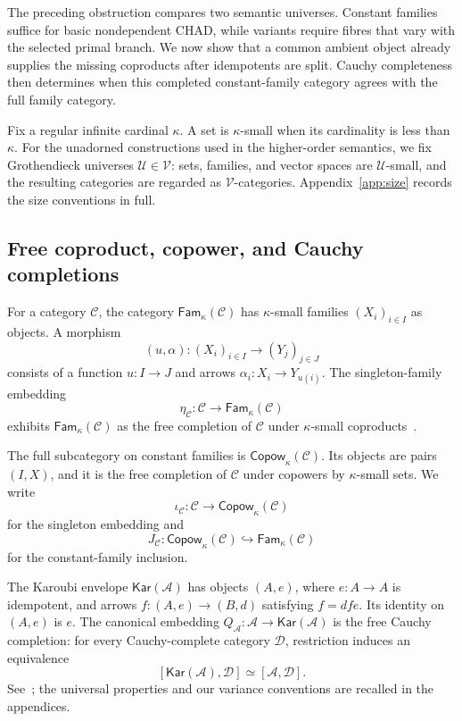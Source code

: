 \documentclass[runningheads,envcountsame]{llncs}
\newcommand{\Copow}{\mathsf{Copow}}
\newcommand{\Fam}{\mathsf{Fam}}
\newcommand{\Kar}{\mathsf{Kar}}
\begin{document}
The preceding obstruction compares two semantic universes. Constant families suffice for basic nondependent CHAD, while variants require fibres that vary with the selected primal branch. We now show that a common ambient object already supplies the missing coproducts after idempotents are split. Cauchy completeness then determines when this completed constant-family category agrees with the full family category.

Fix a regular infinite cardinal $\kappa$. A set is $\kappa$-small when its cardinality is less than $\kappa$. For the unadorned constructions used in the higher-order semantics, we fix Grothendieck universes $\mathcal U\in\mathcal V$: sets, families, and vector spaces are $\mathcal U$-small, and the resulting categories are regarded as $\mathcal V$-categories. Appendix~\ref{app:size} records the size conventions in full.

\subsection{Free coproduct, copower, and Cauchy completions}

For a category $\mathcal C$, the category $\Fam_\kappa(\mathcal C)$ has $\kappa$-small families $(X_i)_{i\in I}$ as objects. A morphism
$$
(u,\alpha):(X_i)_{i\in I}\longrightarrow(Y_j)_{j\in J}
$$
consists of a function $u:I\to J$ and arrows $\alpha_i:X_i\to Y_{u(i)}$. The singleton-family embedding
$$
\eta_{\mathcal C}:\mathcal C\longrightarrow\Fam_\kappa(\mathcal C)
$$
exhibits $\Fam_\kappa(\mathcal C)$ as the free completion of $\mathcal C$ under $\kappa$-small coproducts~\cite{Kelly1982,AdamekRosicky2020}.

The full subcategory on constant families is $\Copow_\kappa(\mathcal C)$. Its objects are pairs $(I,X)$, and it is the free completion of $\mathcal C$ under copowers by $\kappa$-small sets. We write
$$
\iota_{\mathcal C}:\mathcal C\longrightarrow\Copow_\kappa(\mathcal C)
$$
for the singleton embedding and
$$
J_{\mathcal C}:\Copow_\kappa(\mathcal C)\hookrightarrow\Fam_\kappa(\mathcal C)
$$
for the constant-family inclusion.

The Karoubi envelope $\Kar(\mathcal A)$ has objects $(A,e)$, where $e:A\to A$ is idempotent, and arrows $f:(A,e)\to(B,d)$ satisfying $f=dfe$. Its identity on $(A,e)$ is $e$. The canonical embedding $Q_{\mathcal A}:\mathcal A\to\Kar(\mathcal A)$ is the free Cauchy completion: for every Cauchy-complete category $\mathcal D$, restriction induces an equivalence
$$
[\Kar(\mathcal A),\mathcal D]
\simeq
[\mathcal A,\mathcal D].
$$
See~\cite{BorceuxDejean1986,Kelly1982,MacLane1998}; the universal properties and our variance conventions are recalled in the appendices.
\end{document}
